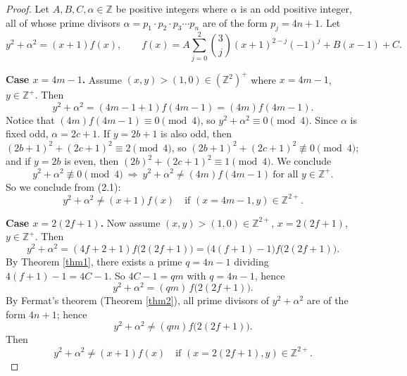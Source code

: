 \documentclass[10pt,a4paper]{amsart}
\begin{document}
\begin{proof}
Let $A,B,C,\alpha\in\mathbb{Z}$ be positive integers where $\alpha$ is an odd positive integer, all of whose prime divisors $\alpha=p_1\cdot p_2\cdot p_3\cdots p_n$ are of the form $p_j=4n+1$. Let
\[
y^2+\alpha^2 = (x+1)f(x), \qquad f(x)=A\sum_{j=0}^2\binom{3}{j}(x+1)^{2-j}(-1)^j+B(x-1)+C.
\]

\textbf{Case $x=4m-1$.} Assume $(x,y)>(1,0)\in(\mathbb{Z}^2)^+$ where $x=4m-1$, $y\in\mathbb{Z}^+$. Then
\[
y^2+\alpha^2 = (4m-1+1)f(4m-1) = (4m)f(4m-1).
\]
Notice that $(4m)f(4m-1)\equiv 0\pmod 4$, so $y^2+\alpha^2\equiv 0\pmod 4$. Since $\alpha$ is fixed odd, $\alpha=2c+1$. If $y=2b+1$ is also odd, then $(2b+1)^2+(2c+1)^2\equiv 2\pmod 4$, so $(2b+1)^2+(2c+1)^2\not\equiv 0\pmod4$; and if $y=2b$ is even, then $(2b)^2+(2c+1)^2\equiv 1\pmod 4$. We conclude
\begin{equation}
y^2+\alpha^2\not\equiv 0\pmod 4 \ \Rightarrow\ y^2+\alpha^2\ne (4m)f(4m-1)\ \text{for all } y\in\mathbb{Z}^+. \tag{2.1}
\end{equation}
So we conclude from (2.1):
\begin{equation}
y^2+\alpha^2 \ne (x+1)f(x) \quad\text{if } (x=4m-1,y)\in\mathbb{Z}^{2+}. \tag{2.2}
\end{equation}

\textbf{Case $x=2(2f+1)$.} Now assume $(x,y)>(1,0)\in\mathbb{Z}^{2+}$, $x=2(2f+1)$, $y\in\mathbb{Z}^+$. Then
\[
y^2+\alpha^2=(4f+2+1)f\big(2(2f+1)\big) = \big(4(f+1)-1\big) f\big(2(2f+1)\big).
\]
By Theorem \ref{thm1}, there exists a prime $q=4n-1$ dividing $4(f+1)-1=4C-1$. So $4C-1=qm$ with $q=4n-1$, hence
\begin{equation}
y^2+\alpha^2 = (qm)\,f\big(2(2f+1)\big). \tag{2.3}
\end{equation}
By Fermat's theorem (Theorem \ref{thm2}), all prime divisors of $y^2+\alpha^2$ are of the form $4n+1$; hence
\begin{equation}
y^2+\alpha^2 \ne (qm)f\big(2(2f+1)\big). \tag{2.4}
\end{equation}
Then
\begin{equation}
y^2+\alpha^2 \ne (x+1)f(x) \quad\text{if } (x=2(2f+1),y)\in\mathbb{Z}^{2+}. \tag{2.5}
\end{equation}


\end{proof}
\end{document}
